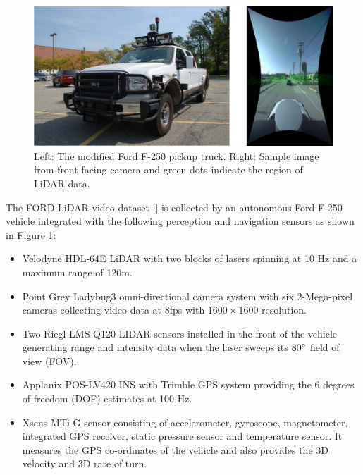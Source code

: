 \documentclass{article}
\begin{document}
\begin{figure}[htbp]
    \centering
        \includegraphics[scale=0.45]{ford_truck_sensor.pdf}
    \caption{Left: The modified Ford F-250 pickup truck. Right: Sample image from front facing camera and green dots indicate the region of LiDAR data.}
    \label{fig:ford-truck-sensors}
\end{figure}

The FORD LiDAR-video dataset [\cite{Pandey2011Ford-Campu}] is collected by an autonomous Ford F-250 vehicle integrated with the following perception and navigation sensors as shown in Figure \ref{fig:ford-truck-sensors}:
\begin{itemize}
    \item Velodyne HDL-64E LiDAR with two blocks of lasers spinning at 10 Hz and a maximum range of 120m.
    \item Point Grey Ladybug3 omni-directional camera system with six 2-Mega-pixel cameras collecting video data at 8fps with $1600\times1600$ resolution.
    \item Two Riegl LMS-Q120 LIDAR sensors installed in the front of the vehicle generating range and intensity data when the laser sweeps its $80\degree$ field of view (FOV).
    \item Applanix POS-LV420 INS with Trimble GPS system providing the 6 degrees of freedom (DOF) estimates at 100 Hz.
    \item Xsens MTi-G sensor consisting of accelerometer, gyroscope, magnetometer, integrated GPS receiver, static pressure sensor and temperature sensor. It measures the GPS co-ordinates of the vehicle and also provides the 3D velocity and 3D rate of turn.
\end{itemize}
\end{document}
